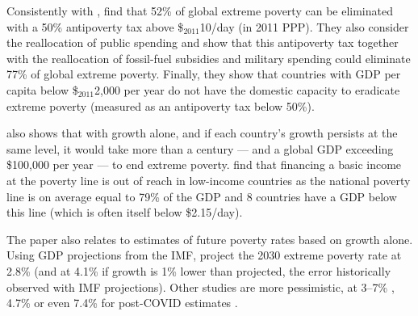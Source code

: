 Consistently with \cite{ravallion_poorer_2010}, \cite{hoy_gasoline_2016} find that 52\% of global extreme poverty can be eliminated with a 50\% antipoverty tax above \$$_\text{2011}$10/day (in 2011 PPP). They also consider the reallocation of public spending and show that this antipoverty tax together with the reallocation of fossil-fuel subsidies and military spending could eliminate 77\% of global extreme poverty. Finally, they show that countries with GDP per capita below \$$_\text{2011}$2,000 per year do not have the domestic capacity to eradicate extreme poverty (measured as an antipoverty tax below 50\%).

\cite{woodward_incrementum_2015} also shows that with growth alone, and if each country's growth persists at the same level, it would take more than a century --- and a global GDP exceeding \$100,000 per year --- to end extreme poverty. %
\cite{ortiz_universal_2018} find that financing a basic income at the poverty line is out of reach in low-income countries as the national poverty line is on average equal to 79\% of the GDP and 8 countries have a GDP below this line (which is often itself below \$2.15/day).

The paper also relates to estimates of future poverty rates based on growth alone. Using GDP projections from the IMF, \cite{karver_mdgs_2012} project the 2030 extreme poverty rate at 2.8\% (and at 4.1\% if growth is 1\% lower than projected, the error historically observed with IMF projections). Other studies are more pessimistic, at 3--7\% \citep{chandy_final_2013,bicaba_can_2017}, 4.7\% \citep{manuel_financing_2018} or even 7.4\% for post-COVID estimates \citep{lakner_how_2022}. 

